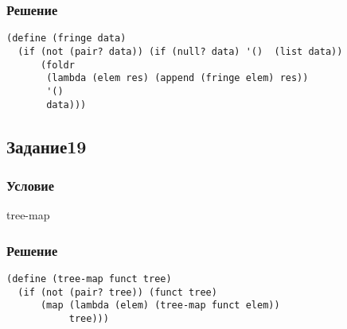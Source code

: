 \documentclass[10pt,a4paper]{article}
\begin{document}
\subsubsection*{Решение}
\begin{lstlisting}
(define (fringe data)
  (if (not (pair? data)) (if (null? data) '()  (list data))
      (foldr
       (lambda (elem res) (append (fringe elem) res))
       '()
       data)))
\end{lstlisting}

\subsection*{Задание19}
\subsubsection*{Условие}
tree-map
\subsubsection*{Решение}
\begin{lstlisting}
(define (tree-map funct tree)
  (if (not (pair? tree)) (funct tree)
      (map (lambda (elem) (tree-map funct elem))
           tree)))
\end{lstlisting}
\end{document}
